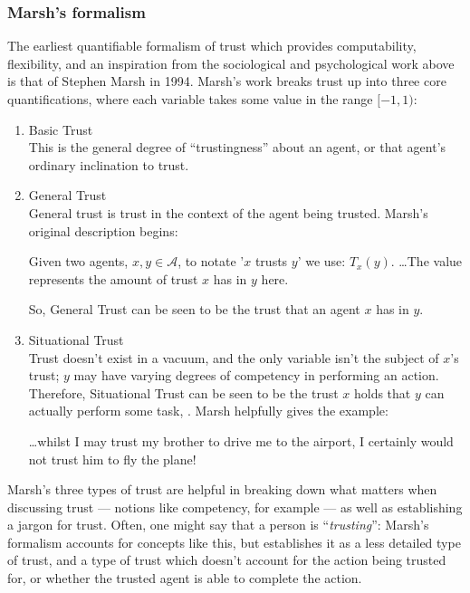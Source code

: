 \subsubsection{Marsh's formalism}
The earliest quantifiable formalism of trust which provides computability, flexibility, and an inspiration from the sociological and psychological work above is that of Stephen Marsh in 1994\cite{Marsh1994FormalisingConcept}. Marsh's work breaks trust up into three core quantifications, where each variable takes some value in the range \({[-1,1)}\):
\begin{enumerate}
    \item Basic Trust \\
    This is the general degree of ``trustingness'' about an agent, or that agent's ordinary inclination to trust.
    \item General Trust \\
    General trust is trust in the context of the agent being trusted. Marsh's original description begins\cite{Marsh1994FormalisingConcept}:
    \begin{displayquote}
        Given two agents, \(x, y \in \mathcal{A}\), to notate '\(x\) trusts \(y\)'  we use: \(T_{x}(y)\). {\ldots}The value represents the amount of trust \(x\) has in \(y\) here.
    \end{displayquote}
    So, General Trust can be seen to be the trust that an agent \(x\) has in \(y\).
    \item Situational Trust \\
    Trust doesn't exist in a vacuum, and the only variable isn't the subject of \(x\)'s trust; \(y\) may have varying degrees of competency in performing an action. Therefore, Situational Trust can be seen to be the trust \(x\) holds that \(y\) can actually perform some task, \safealpha. Marsh helpfully gives the example\cite{Marsh1994FormalisingConcept}:
    \begin{displayquote}
        {\ldots}whilst I may trust my brother to drive me to the airport, I certainly would not trust him to fly the plane!
    \end{displayquote}
\end{enumerate}\par

Marsh's three types of trust are helpful in breaking down what matters when discussing trust --- notions like competency, for example --- as well as establishing a jargon for trust. Often, one might say that a person is ``\emph{trusting}'': Marsh's formalism accounts for concepts like this, but establishes it as a less detailed type of trust, and a type of trust which doesn't account for the action being trusted for, or whether the trusted agent is able to complete the action.\par

